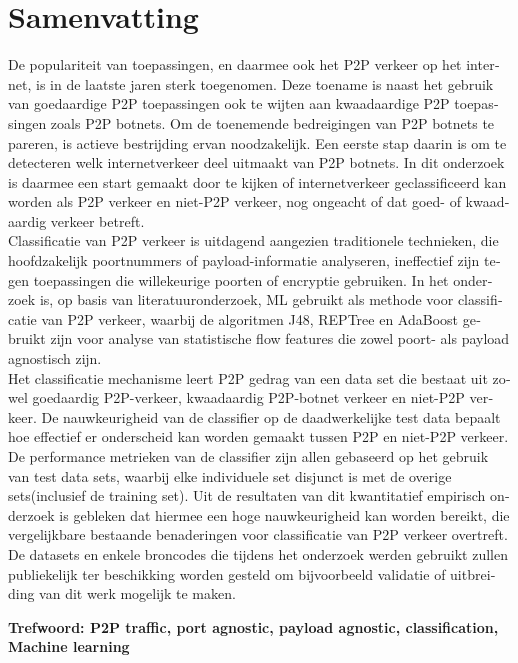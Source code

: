 \chapter{Samenvatting}
\ifpdf
    \graphicspath{{Summary/Figs/Raster/}{Summary/Figs/PDF/}{Summary/Figs/}}
\else
    \graphicspath{{Summary/Figs/Vector/}{Summary/Figs/}}
\fi

\begin{otherlanguage}{dutch}
De populariteit van  toepassingen, en daarmee ook het P2P verkeer op het internet, is in de laatste jaren sterk toegenomen. 
Deze toename is naast het gebruik van goedaardige P2P toepassingen ook te wijten aan kwaadaardige P2P toepassingen zoals P2P \glspl{botnet}. 
Om de toenemende bedreigingen van P2P botnets te pareren, is actieve bestrijding ervan noodzakelijk. 
Een eerste stap daarin is om te detecteren welk internetverkeer deel uitmaakt van P2P botnets. 
In dit onderzoek is daarmee een start gemaakt door te kijken of internetverkeer geclassificeerd kan worden als P2P verkeer en niet-P2P verkeer, nog ongeacht of dat goed- of kwaadaardig verkeer betreft.\\

\noindent
Classificatie van P2P verkeer is uitdagend aangezien traditionele technieken, die hoofdzakelijk poortnummers of payload-informatie analyseren, ineffectief zijn tegen toepassingen die willekeurige poorten of encryptie gebruiken. 
In het onderzoek is, op basis van literatuuronderzoek, \gls{ML} gebruikt als methode voor classificatie van P2P verkeer, waarbij de algoritmen J48, REPTree en AdaBoost gebruikt zijn voor analyse van statistische flow features die zowel poort- als payload agnostisch zijn.\\

\noindent
Het classificatie mechanisme leert P2P gedrag van een data set die bestaat uit zowel goedaardig P2P-verkeer, kwaadaardig P2P-botnet verkeer en niet-P2P verkeer.
De nauwkeurigheid van de classifier op de daadwerkelijke test data bepaalt hoe effectief er onderscheid kan worden gemaakt tussen P2P en niet-P2P verkeer.
De performance metrieken van de classifier zijn allen gebaseerd op het gebruik van test data sets, waarbij elke individuele set disjunct is met de overige sets(inclusief de training set).
Uit de resultaten van dit kwantitatief empirisch onderzoek is gebleken dat hiermee een hoge nauwkeurigheid kan worden bereikt, die vergelijkbare bestaande benaderingen voor classificatie van P2P verkeer overtreft.\\


\noindent
De datasets en enkele broncodes die tijdens het onderzoek werden gebruikt zullen publiekelijk ter beschikking worden gesteld om bijvoorbeeld validatie of uitbreiding van dit werk mogelijk te maken.


\end{otherlanguage}


\vspace{2cm}

\noindent
\textbf{Trefwoord: P2P traffic, port agnostic, payload agnostic, classification, Machine learning}
